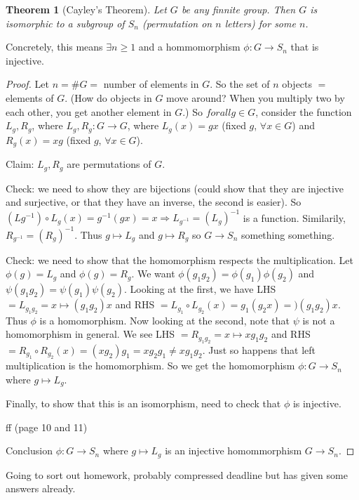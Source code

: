 \documentclass{article}
\theoremstyle{plain}
\newtheorem{theorem}{Theorem}
\theoremstyle{remark}
\begin{document}
\begin{theorem}[Cayley's Theorem]
Let $G$ be any finnite group.
Then $G$ is isomorphic to a subgroup of $S_n$ (permutation on $n$ letters)
for some $n$.
\end{theorem}
Concretely, this means $\exists n \geq 1$ and a hommomorphism
$\phi \colon G \to S_n$ that is injective.

\begin{proof}
Let $n = \# G =$ number of elements in $G$.
So the set of $n$ objects $=$ elements of $G$.
(How do objects in $G$ move around?
When you multiply two by each other,
you get another element in $G$.)
So $forall g \in G$, consider the function $L_g, R_g$,
where $L_g, R_g \colon G \to G$,
where $L_g(x) = gx$ (fixed $g$, $\forall x \in G$)
and $R_g(x) = xg$ (fixed $g$, $\forall x \in G$).

Claim: $L_g, R_g$ are permutations of $G$.

Check: we need to show they are bijections
(could show that they are injective and surjective,
or that they have an inverse, the second is easier).
So $(Lg^{-1})\circ L_g(x) = g^{-1}(gx) = x
\Rightarrow L_{g^{-1}} = (L_g)^{-1}$ is a function.
Similarily, $R_{g^{-1}} = (R_g)^{-1}$.
Thus $g \mapsto L_g$ and $g \mapsto R_g$ so $G \to S_n$ something something.

Check: we need to show that the homomorphism respects the multiplication.
Let $\phi(g) = L_g$ and $\phi(g) = R_g$.
We want $\phi(g_1 g_2) = \phi(g_1)\phi(g_2)$
and $\psi(g_1 g_2) = \psi(g_1)\psi(g_2)$.
Looking at the first, we have LHS $= L_{g_1g_2} = x \mapsto (g_1g_2)x$
and RHS $= L_{g_1} \circ L_{g_2}(x) = g_1(g_2 x) = )(g_1 g_2)x$.
Thus $\phi$ is a homomorphism.
Now looking at the second, note that $\psi$ is not a homomorphism in general.
We see LHS $= R_{g_1g_2} = x \mapsto xg_1g_2$
and RHS $= R_{g_1} \circ R_{g_2}(x) = (xg_2)g_1 = xg_2g_1 \neq xg_1g_2$.
Just so happens that left multiplication is the homomorphism.
So we get the homomorphism $\phi \colon G \to S_n$ where $g \mapsto L_g$.

Finally, to show that this is an isomorphism, need to check that $\phi$ is injective.

ff (page 10 and 11)

Conclusion $\phi \colon G \to S_n$ where $g \mapsto L_g$
is an injective homommorphism $G \to S_n$.
\end{proof}

Going to sort out homework,
probably compressed deadline but has given some answers already.
\end{document}
